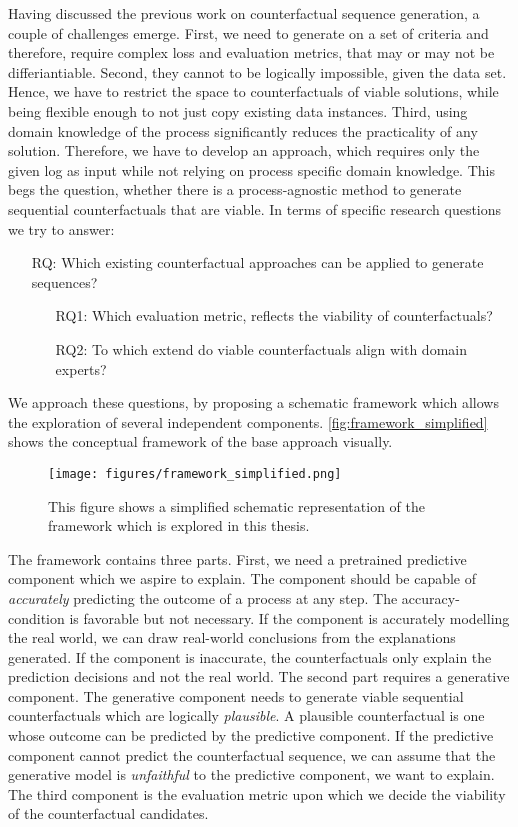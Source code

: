 \documentclass[./../../paper.tex]{subfiles}
\begin{document}
Having discussed the previous work on counterfactual sequence generation, a couple of challenges emerge. 
First, we need to generate on a set of criteria and therefore, require complex loss and evaluation metrics, that may or may not be differiantiable. Second, they cannot to be logically impossible, given the data set. 
Hence, we have to restrict the space to counterfactuals of viable solutions, while being flexible enough to not just copy existing data instances. 
Third, using domain knowledge of the process significantly reduces the practicality of any solution. Therefore, we have to develop an approach, which requires only the given log as input while not relying on process specific domain knowledge. This begs the question, whether there is a process-agnostic method to generate sequential counterfactuals that are viable. In terms of specific research questions we try to answer:

\begin{itemize}
    \item[RQ:] Which existing counterfactual approaches can be applied to generate sequences?
    \begin{itemize}
        \item[RQ1:] Which evaluation metric, reflects the viability of counterfactuals?
        \item[RQ2:] To which extend do viable counterfactuals align with domain experts?  
    \end{itemize}
\end{itemize}

\noindent We approach these questions, by proposing a schematic framework which allows the exploration of several independent components. \autoref{fig:framework_simplified} shows the conceptual framework of the base approach visually.

\begin{figure}[htb]
    \label{fig:framework_simplified}
    \centering
    \texttt{[image: figures/framework\_simplified.png]}
    \caption{This figure shows a simplified schematic representation of the framework which is explored in this thesis.}
\end{figure}

\noindent The framework contains three parts. First, we need a pretrained predictive component which we aspire to explain. The component should be capable of \emph{accurately} predicting the outcome of a process at any step. The accuracy-condition is favorable but not necessary. If the component is accurately modelling the real world, we can draw real-world conclusions from the explanations generated. If the component is inaccurate, the counterfactuals only explain the prediction decisions and not the real world. The second part requires a generative component. The generative component needs to generate viable sequential counterfactuals which are logically \emph{plausible}. A plausible counterfactual is one whose outcome can be  predicted by the predictive component. If the predictive component cannot predict the counterfactual sequence, we can assume that the generative model is \emph{unfaithful} to the predictive component, we want to explain. The third component is the evaluation metric upon which we decide the viability of the counterfactual candidates.
\end{document}
